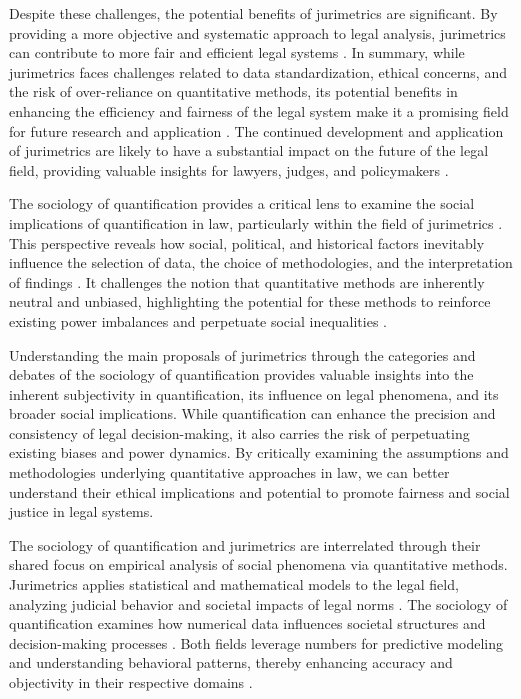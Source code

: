 Despite these challenges, the potential benefits of jurimetrics are significant. By providing a more objective and systematic approach to legal analysis, jurimetrics can contribute to more fair and efficient legal systems \cite{jurimetricschallenges}. In summary, while jurimetrics faces challenges related to data standardization, ethical concerns, and the risk of over-reliance on quantitative methods, its potential benefits in enhancing the efficiency and fairness of the legal system make it a promising field for future research and application \cite{jurimetricschallenges}. The continued development and application of jurimetrics are likely to have a substantial impact on the future of the legal field, providing valuable insights for lawyers, judges, and policymakers \cite{jurimetricschallenges}.

The sociology of quantification provides a critical lens to examine the social implications of quantification in law, particularly within the field of jurimetrics \cite{10.1057/s41599-020-00557-0,de2010jurimetrics}. This perspective reveals how social, political, and historical factors inevitably influence the selection of data, the choice of methodologies, and the interpretation of findings \cite{10.1057/s41599-020-00557-0,de2010jurimetrics}. It challenges the notion that quantitative methods are inherently neutral and unbiased, highlighting the potential for these methods to reinforce existing power imbalances and perpetuate social inequalities \cite{10.1057/s41599-020-00557-0,de2010jurimetrics}.

Understanding the main proposals of jurimetrics through the categories and debates of the sociology of quantification provides valuable insights into the inherent subjectivity in quantification, its influence on legal phenomena, and its broader social implications. While quantification can enhance the precision and consistency of legal decision-making, it also carries the risk of perpetuating existing biases and power dynamics. By critically examining the assumptions and methodologies underlying quantitative approaches in law, we can better understand their ethical implications and potential to promote fairness and social justice in legal systems.

The sociology of quantification and jurimetrics are interrelated through their shared focus on empirical analysis of social phenomena via quantitative methods. Jurimetrics applies statistical and mathematical models to the legal field, analyzing judicial behavior and societal impacts of legal norms \cite{nunes2016, nunes2016}. The sociology of quantification examines how numerical data influences societal structures and decision-making processes \cite{paiva2021, zabala1809}. Both fields leverage numbers for predictive modeling and understanding behavioral patterns, thereby enhancing accuracy and objectivity in their respective domains \cite{nunes2016, colombo2017}.

